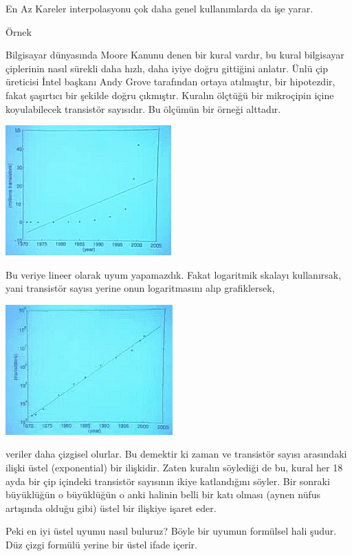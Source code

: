 \documentclass[12pt,fleqn]{article}\usepackage{../../common}
\begin{document}
En Az Kareler interpolasyonu çok daha genel kullanımlarda da işe yarar. 

Örnek

Bilgisayar dünyasında Moore Kanunu denen bir kural vardır, bu kural
bilgisayar çiplerinin nasıl sürekli daha hızlı, daha iyiye doğru gittiğini
anlatır. Ünlü çip üreticisi İntel başkanı Andy Grove tarafından ortaya
atılmıştır, bir hipotezdir, fakat şaşırtıcı bir şekilde doğru
çıkmıştır. Kuralın ölçtüğü bir mikroçipin içine koyulabilecek transistör
sayısıdır. Bu ölçümün bir örneği alttadır.

\begin{center}
\includegraphics[height=5cm]{9_7.png}
\end{center}

Bu veriye lineer olarak uyum yapamazdık. Fakat logaritmik skalayı kullanırsak,
yani transistör sayısı yerine onun logaritmasını alıp grafiklersek,

\begin{center}
\includegraphics[height=5cm]{9_8.png}
\end{center}

veriler daha çizgisel olurlar. Bu demektir ki zaman ve transistör sayısı
arasındaki ilişki üstel (exponential) bir ilişkidir. Zaten kuralın söylediği de
bu, kural her 18 ayda bir çip içindeki transistör sayısının ikiye katlandığını
söyler. Bir sonraki büyüklüğün o büyüklüğün o anki halinin belli bir katı olması
(aynen nüfus artışında olduğu gibi) üstel bir ilişkiye işaret eder.

Peki en iyi üstel uyumu nasıl buluruz? Böyle bir uyumun formülsel hali
şudur. Düz çizgi formülü yerine bir üstel ifade içerir. 
\end{document}
